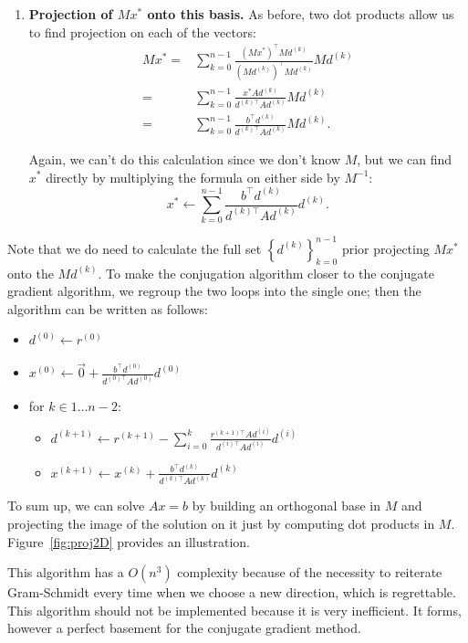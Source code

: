 \documentclass[notitlepage,oneside]{book}
\begin{document}
\begin{enumerate}
\item {\bf Projection of $Mx^*$ onto this basis.}
As before, two dot products allow us to find projection on each of the vectors:
\begin{align*}
  Mx^* =& \sum_{k=0}^{n-1} \frac{(Mx^*)^\top Md^{(k)}}{(Md^{(k)})^\top Md^{(k)}} Md^{(k)}\\
    =& \sum_{k=0}^{n-1} \frac{x^*Ad^{(k)}}{d^{(k)\top}Ad^{(k)}} Md^{(k)} \\
  =& \sum_{k=0}^{n-1} \frac{b^\top d^{(k)}}{d^{(k)\top}Ad^{(k)}} Md^{(k)}. 
\end{align*}

Again, we can't do this calculation since we don't know $M$, but we can find $x^*$ directly by multiplying the formula on either side by $M^{-1}$:
$$
x^* \leftarrow \sum_{k=0}^{n-1} \frac{b^\top d^{(k)}}{d^{(k)\top}Ad^{(k)}} d^{(k)}.
$$
\end{enumerate}

Note that we do need to calculate the full set $\left\{d^{(k)}\right\}_{k=0}^{n-1}$ prior projecting $Mx^*$ onto the $Md^{(k)}$.
To make the conjugation algorithm closer to the conjugate gradient algorithm, we regroup the two loops into the single one;
then the algorithm can be written as follows:
\begin{framed}
\begin{itemize}
\item $d^{(0)}\leftarrow r^{(0)}$
\item $x^{(0)} \leftarrow \vec{0} + \frac{b^\top d^{(0)}}{d^{(0)\top}Ad^{(0)}} d^{(0)}$
\item for $k \in 1\dots n-2$:
\begin{itemize}
    \item $d^{(k+1)} \leftarrow r^{(k+1)} - \sum_{i=0}^k \frac{r^{(k+1)\top}Ad^{(i)}}{d^{(i)\top}Ad^{(i)}} d^{(i)}$
    \item $x^{(k+1)} \leftarrow x^{(k)} + \frac{b^\top d^{(k)}}{d^{(k)\top}Ad^{(k)}} d^{(k)}$
\end{itemize}
\end{itemize}
\end{framed}


To sum up, we can solve $Ax=b$ by building an orthogonal base in $M$ and projecting the image of the solution on it just by computing dot products in $M$.
Figure~\ref{fig:proj2D} provides an illustration.

This algorithm has a $O(n^3)$ complexity because of the necessity to reiterate Gram-Schmidt every time when we choose a new direction, which is regrettable.
This algorithm should not be implemented because it is very inefficient.
It forms, however a perfect basement for the conjugate gradient method.
\end{document}
